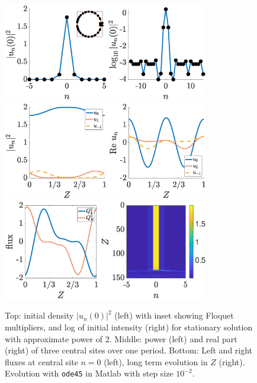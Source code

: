\documentclass[reprint, amsmath,amssymb,aps,pre]{revtex4-2}
\begin{document}
\begin{figure}
    \centering
    \includegraphics[width=9cm]{stat2a.eps}
    \includegraphics[width=9cm]{stat2b.eps}
    \includegraphics[width=9cm]{stat2c.eps}
    \caption{Top: initial density $|u_n(0)|^2$ (left) with inset showing Floquet multipliers, and log of initial intensity (right) for stationary solution with approximate power of 2. Middle: power (left) and real part (right) of three central sites over one period. Bottom: Left and right fluxes at central site $n=0$ (left), long term evolution in $Z$ (right). Evolution with \texttt{ode45} in Matlab with step size $10^{-2}$.} %
    \label{fig:stat2}
\end{figure}
\end{document}
